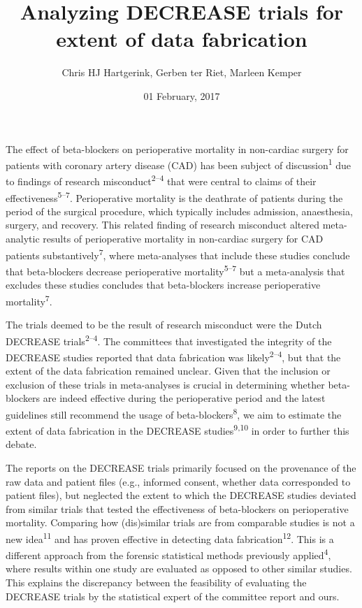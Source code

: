 \documentclass[]{article}
\title{Analyzing DECREASE trials for extent of data fabrication}
\author{Chris HJ Hartgerink, Gerben ter Riet, Marleen Kemper}
\date{01 February, 2017}
\begin{document}
\maketitle

The effect of beta-blockers on perioperative mortality in non-cardiac
surgery for patients with coronary artery disease (CAD) has been subject
of discussion\textsuperscript{1} due to findings of research
misconduct\textsuperscript{2--4} that were central to claims of their
effectiveness\textsuperscript{5--7}. Perioperative mortality is the
deathrate of patients during the period of the surgical procedure, which
typically includes admission, anaesthesia, surgery, and recovery. This
related finding of research misconduct altered meta-analytic results of
perioperative mortality in non-cardiac surgery for CAD patients
substantively\textsuperscript{7}, where meta-analyses that include these
studies conclude that beta-blockers decrease perioperative
mortality\textsuperscript{5--7} but a meta-analysis that excludes these
studies concludes that beta-blockers increase perioperative
mortality\textsuperscript{7}.

The trials deemed to be the result of research misconduct were the Dutch
DECREASE trials\textsuperscript{2--4}. The committees that investigated
the integrity of the DECREASE studies reported that data fabrication was
likely\textsuperscript{2--4}, but that the extent of the data
fabrication remained unclear. Given that the inclusion or exclusion of
these trials in meta-analyses is crucial in determining whether
beta-blockers are indeed effective during the perioperative period and
the latest guidelines still recommend the usage of
beta-blockers\textsuperscript{8}, we aim to estimate the extent of data
fabrication in the DECREASE studies\textsuperscript{9,10} in order to
further this debate.

The reports on the DECREASE trials primarily focused on the provenance
of the raw data and patient files (e.g., informed consent, whether data
corresponded to patient files), but neglected the extent to which the
DECREASE studies deviated from similar trials that tested the
effectiveness of beta-blockers on perioperative mortality. Comparing how
(dis)similar trials are from comparable studies is not a new
idea\textsuperscript{11} and has proven effective in detecting data
fabrication\textsuperscript{12}. This is a different approach from the
forensic statistical methods previously applied\textsuperscript{4},
where results within one study are evaluated as opposed to other similar
studies. This explains the discrepancy between the feasibility of
evaluating the DECREASE trials by the statistical expert of the
committee report and ours.
\end{document}
